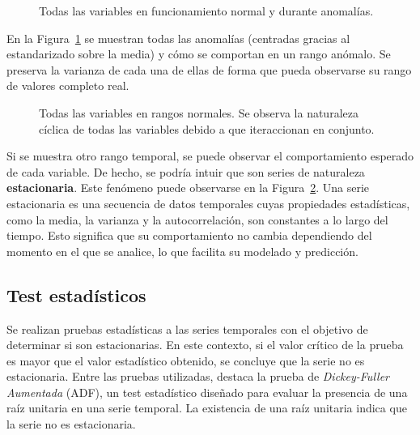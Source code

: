 \documentclass[12pt,letterpaper]{article}
\begin{document}
\begin{figure}[htp]
    \centering
    \caption{Todas las variables en funcionamiento normal y durante anomalías. }
    \label{fig:all_anomalies}
\end{figure}

En la Figura~\ref{fig:all_anomalies} se muestran todas las anomalías (centradas gracias al estandarizado sobre la media) y cómo se comportan en un rango anómalo. Se preserva la varianza de cada una de ellas de forma que pueda observarse su rango de valores completo real.

\begin{figure}[htp]
    \centering
    \caption{Todas las variables en rangos normales. Se observa la naturaleza cíclica de todas las variables debido a que iteraccionan en conjunto.}
    \label{fig:all_normal}
\end{figure}


Si se muestra otro rango temporal, se puede observar el comportamiento esperado de cada variable. De hecho, se podría intuir que son series de naturaleza \textbf{estacionaria}. Este fenómeno puede observarse en la Figura~\ref{fig:all_normal}.
Una serie estacionaria es una secuencia de datos temporales cuyas propiedades estadísticas, como la media, la varianza y la autocorrelación, son constantes a lo largo del tiempo. Esto significa que su comportamiento no cambia dependiendo del momento en el que se analice, lo que facilita su modelado y predicción.

\subsection{Test estadísticos}
Se realizan pruebas estadísticas a las series temporales con el objetivo de determinar si son estacionarias. En este contexto, si el valor crítico de la prueba es mayor que el valor estadístico obtenido, se concluye que la serie no es estacionaria.
Entre las pruebas utilizadas, destaca la prueba de \textit{Dickey-Fuller Aumentada} (ADF), un test estadístico diseñado para evaluar la presencia de una raíz unitaria en una serie temporal. La existencia de una raíz unitaria indica que la serie no es estacionaria.
\end{document}
